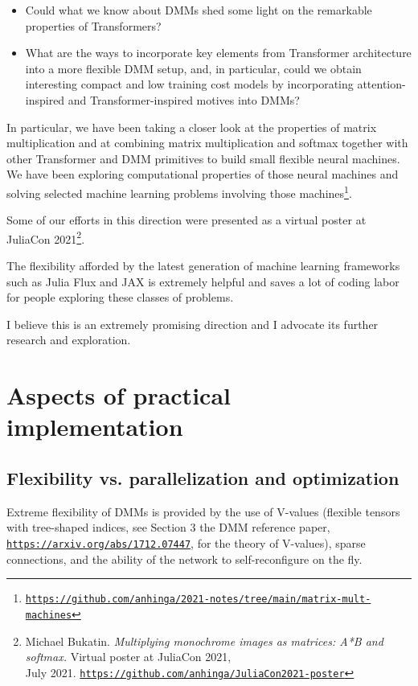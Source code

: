 \documentclass{article}
\begin{document}
\begin{itemize}
   \item Could what we know about DMMs shed some light on the remarkable properties of Transformers?
   \item What are the ways to incorporate key elements from Transformer architecture into a more flexible DMM setup, 
           and, in particular, could we obtain interesting compact and low training cost models by 
           incorporating attention-inspired and Transformer-inspired motives into DMMs?
\end{itemize}

In particular, we have been taking a closer look at the properties of matrix multiplication and at combining matrix multiplication and
softmax together with other Transformer and DMM primitives to build small flexible neural machines. We have been exploring computational
properties of those neural machines and solving selected machine learning problems involving those
machines\footnote{\href {https://github.com/anhinga/2021-notes/tree/main/matrix-mult-machines}
{\tt https://github.com/anhinga/2021-notes/tree/main/matrix-mult-machines}}.

Some of our efforts in this direction were presented as a virtual poster at 
JuliaCon 2021\footnote{Michael Bukatin.
{\em Multiplying monochrome images as matrices: A*B and softmax.} 
Virtual poster at JuliaCon 2021,\\
July 2021. \href{https://github.com/anhinga/JuliaCon2021-poster}{\tt https://github.com/anhinga/JuliaCon2021-poster}}.

The flexibility afforded by the latest generation of machine learning frameworks such as
Julia Flux and JAX is extremely helpful and saves a lot of coding labor for people exploring these classes of problems.

I believe this is an extremely promising direction and I advocate its further research and exploration.

\section{Aspects of practical implementation}

\subsection{Flexibility vs. parallelization and optimization} 

Extreme flexibility of DMMs is provided by the use of V-values (flexible tensors with tree-shaped indices, 
see Section 3 the DMM reference paper, \href{https://arxiv.org/abs/1712.07447}{\tt https://arxiv.org/abs/1712.07447}, for
the theory of V-values),
sparse connections, and the ability of the network to self-reconfigure on the fly.
\end{document}
